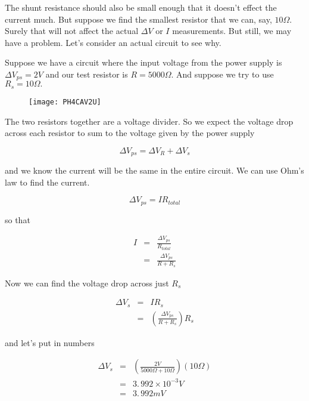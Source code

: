 The shunt resistance should also be small enough that it doesn't effect the current much. But suppose we find the smallest resistor that we can, say, $10\unit{\Omega}.$ Surely that will not affect the actual $\Delta V$ or $I$ measurements. But still, we may have a problem. Let's consider an actual circuit to see why.

Suppose we have a circuit where the input voltage from the power supply is $\Delta V_{ps}=2\unit{V}$ and our test resistor is $R=5000\unit{\Omega}.$ And suppose we try to use $R_{s}=10\unit{\Omega}.$ 

\begin{figure}[h!]
	\texttt{[image: PH4CAV2U]}
\end{figure}

The two resistors together are a voltage divider. So we expect the voltage drop across each resistor to sum to the voltage given by the power supply

\begin{equation*}
	\Delta V_{ps}=\Delta V_{R}+\Delta V_{s}
\end{equation*}

\noindent and we know the current will be the same in the entire circuit. We can use Ohm's law to find the current.

\begin{equation*}
	\Delta V_{ps}=IR_{total}
\end{equation*}

\noindent so that 

\begin{eqnarray*}
	I &=&\frac{\Delta V_{ps}}{R_{total}} \\
	  &=&\frac{\Delta V_{ps}}{R+R_{s}}
\end{eqnarray*}

Now we can find the voltage drop across just $R_{s}$

\begin{eqnarray*}
	\Delta V_{s} &=&IR_{s} \\
                 &=&\left( \frac{\Delta V_{ps}}{R+R_{s}}\right) R_{s}
\end{eqnarray*}

\noindent and let's put in numbers

\begin{eqnarray*}
	\Delta V_{s} &=&\left(\frac{2\unit{V}}{5000\unit{\Omega}+10\unit{\Omega}}\right) \left( 10\unit{\Omega}\right) \\
    &=&3.\,\allowbreak 992\times 10^{-3}\unit{V} \\
    &=&3.\,\allowbreak 992\unit{mV}
\end{eqnarray*}

